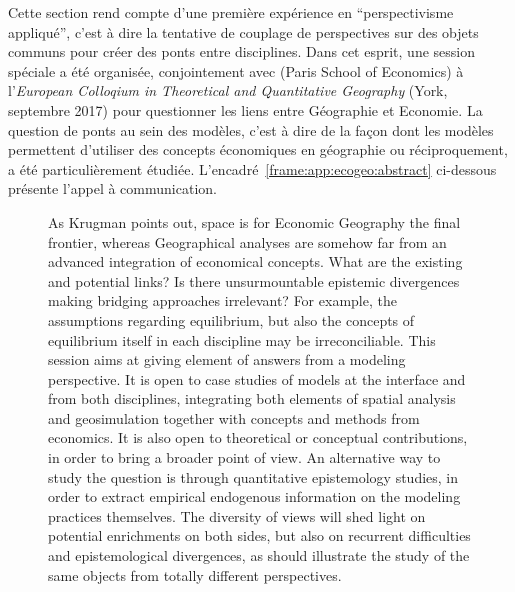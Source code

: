 Cette section rend compte d'une première expérience en ``perspectivisme appliqué'', c'est à dire la tentative de couplage de perspectives sur des objets communs pour créer des ponts entre disciplines. Dans cet esprit, une session spéciale a été organisée, conjointement avec  (Paris School of Economics) à l'\emph{European Colloqium in Theoretical and Quantitative Geography} (York, septembre 2017) pour questionner les liens entre Géographie et Economie. La question de ponts au sein des modèles, c'est à dire de la façon dont les modèles permettent d'utiliser des concepts économiques en géographie ou réciproquement, a été particulièrement étudiée. L'encadré~\ref{frame:app:ecogeo:abstract} ci-dessous présente l'appel à communication.


\begin{figure}[h!]
\begin{mdframed}
	
	As Krugman points out, space is for Economic Geography the final frontier, whereas Geographical analyses are somehow far from an advanced integration of economical concepts. What are the existing and potential links? Is there unsurmountable epistemic divergences making bridging approaches irrelevant? For example, the assumptions regarding equilibrium, but also the concepts of equilibrium itself in each discipline may be irreconciliable. This session aims at giving element of answers from a modeling perspective. It is open to case studies of models at the interface and from both disciplines, integrating both elements of spatial analysis and geosimulation together with concepts and methods from economics. It is also open to theoretical or conceptual contributions, in order to bring a broader point of view. An alternative way to study the question is through quantitative epistemology studies, in order to extract empirical endogenous information on the modeling practices themselves. The diversity of views will shed light on potential enrichments on both sides, but also on recurrent difficulties and epistemological divergences, as should illustrate the study of the same objects from totally different perspectives.
	
	\medskip
	
\end{mdframed}
\end{figure}



